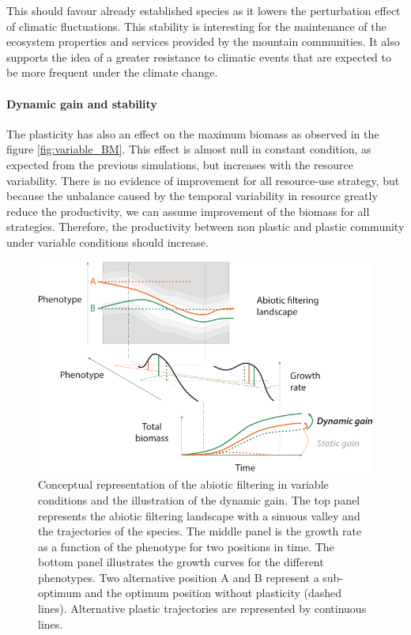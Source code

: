 This  should favour already established species as it lowers the perturbation effect of climatic fluctuations. This stability is interesting for the maintenance of the ecosystem properties and services provided by the mountain communities. It also supports the idea of a greater resistance to climatic events that are expected to be more frequent under the climate change. 


\paragraph{Dynamic gain and stability}

The plasticity has also an effect on the maximum biomass as observed in the figure \ref{fig:variable_BM}. This effect is almost null in constant condition, as expected from the previous simulations, but increases with the resource variability. There is no evidence of improvement for all resource-use strategy, but because the unbalance caused by the temporal variability in resource greatly reduce the productivity, we can assume improvement of the biomass for all strategies. Therefore, the productivity between non plastic and plastic community under variable conditions should increase.

\begin{figure}\label{fig:variable_filter}
\includegraphics[width = \textwidth]{./2_PP/Figures/Variable/variable_filter.pdf}
\caption[Abiotic filtering in temporally variable conditions]{Conceptual representation of the abiotic filtering in variable conditions and the illustration of the dynamic gain. The top panel represents the abiotic filtering landscape with a sinuous valley and the trajectories of the species. The middle panel is the growth rate as a function of the phenotype for two positions in time. The bottom panel illustrates the growth curves for the different phenotypes. Two alternative position \textcolor{myOrange}{A} and \textcolor{myGreen}{B} represent a sub-optimum and the optimum position without plasticity (dashed lines). Alternative plastic trajectories are represented by continuous lines.}
\end{figure}

